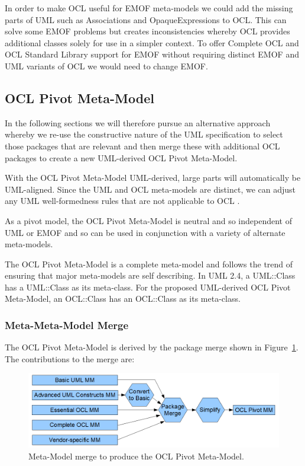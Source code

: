 \documentclass{eceasst}
\begin{document}
In order to make OCL useful for EMOF meta-models we could add the missing parts of UML such as Associations and OpaqueExpressions to OCL. This can solve some EMOF problems but creates inconsistencies whereby OCL provides additional classes solely for use in a simpler context. To offer Complete OCL and OCL Standard Library support for EMOF without requiring distinct EMOF and UML variants of OCL we would need to change EMOF.

\subsection{OCL Pivot Meta-Model}\label{PivotMetaModel}

In the following sections we will therefore pursue an alternative approach whereby we re-use the constructive nature of the UML specification to select those packages that are relevant and then merge these with additional OCL packages to create a new UML-derived OCL Pivot Meta-Model.

With the OCL Pivot Meta-Model UML-derived, large parts will automatically be UML-aligned. Since the UML and OCL meta-models are distinct, we can adjust any UML well-formedness rules that are not applicable to OCL .

As a pivot model, the OCL Pivot Meta-Model is neutral and so independent of UML or EMOF and so can be used in conjunction with a variety of alternate meta-models.

The OCL Pivot Meta-Model is a complete meta-model and follows the trend of ensuring that major meta-models are self describing. In UML 2.4, a UML::Class has a UML::Class as its meta-class. For the proposed UML-derived OCL Pivot Meta-Model, an OCL::Class has an OCL::Class as its meta-class.  

\subsubsection{Meta-Meta-Model Merge}

The OCL Pivot Meta-Model is derived by the package merge  shown in Figure~\ref{fig:UMLMMtoOCLMM}. The contributions to the merge are:


\begin{figure}
  \begin{center}
    \includegraphics[width=5.75in]{UMLMMtoOCLMM.png}
  \end{center}
  \caption{Meta-Model merge to produce the OCL Pivot Meta-Model.}
  \label{fig:UMLMMtoOCLMM}
\end{figure}
\end{document}
